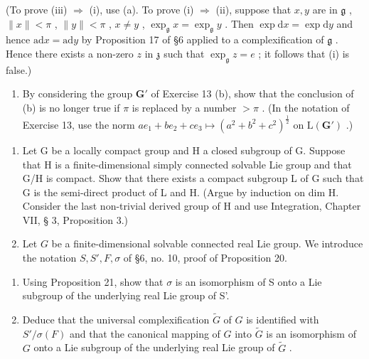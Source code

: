 (To prove (iii) \(\Rightarrow\) (i), use (a). To prove (i) \(\Rightarrow\) (ii), suppose that \(x, y\) are in \(\mathfrak{g}\) , \(\| x \| < \pi\) , \(\| y \| < \pi\) , \(x \neq y\) , \(\exp_{\mathfrak{g}} x = \exp_{\mathfrak{g}} y\) . Then \(\exp \mathrm{d} x = \exp \mathrm{d} y\) and hence \(\mathrm{ad} x = \mathrm{ad} y\) by Proposition 17 of §6 applied to a complexification of \(\mathfrak{g}\) . Hence there exists a non-zero \(z\) in \(\mathfrak{z}\) such that \(\exp_{\mathfrak{g}} z = e\) ; it follows that (i) is false.)

\begin{enumerate}
\def\labelenumi{(\alph{enumi})}
\setcounter{enumi}{2}
\tightlist
\item
  By considering the group \(\mathbf{G}'\) of Exercise 13 (b), show that the conclusion of (b) is no longer true if \(\pi\) is replaced by a number \(> \pi\) . (In the notation of Exercise 13, use the norm \(ae_{1} + be_{2} + ce_{3} \mapsto (a^{2} + b^{2} + c^{2})^{\frac{1}{2}}\) on \(\mathrm{L}(\mathbf{G}')\) .)
\end{enumerate}

\begin{enumerate}
\def\labelenumi{\arabic{enumi}.}
\setcounter{enumi}{18}
\item
  Let G be a locally compact group and H a closed subgroup of G. Suppose that H is a finite-dimensional simply connected solvable Lie group and that G/H is compact. Show that there exists a compact subgroup L of G such that G is the semi-direct product of L and H. (Argue by induction on dim H. Consider the last non-trivial derived group of H and use Integration, Chapter VII, § 3, Proposition 3.)
\item
  Let \(G\) be a finite-dimensional solvable connected real Lie group. We introduce the notation \(S, S', F, \sigma\) of §6, no. 10, proof of Proposition 20.
\end{enumerate}

\begin{enumerate}
\def\labelenumi{(\alph{enumi})}
\item
  Using Proposition 21, show that \(\sigma\) is an isomorphism of S onto a Lie subgroup of the underlying real Lie group of S'.
\item
  Deduce that the universal complexification \(\tilde{G}\) of \(G\) is identified with \(S' / \sigma(F)\) and that the canonical mapping of \(G\) into \(\tilde{G}\) is an isomorphism of \(G\) onto a Lie subgroup of the underlying real Lie group of \(\tilde{G}\) .
\end{enumerate}

